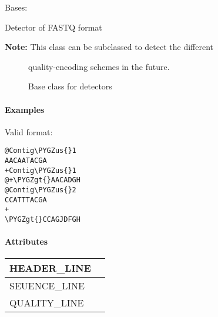 \documentclass[letterpaper,10pt,english]{sphinxmanual}
\def\PYGZus{\char`\_}
\def\PYGZgt{\char`\>}
\begin{document}
\begin{fulllineitems}
\label{fseq.reading:fseq.reading.seq_encoder.FastQ}
Bases: {\hyperref[fseq.reading:fseq.reading.seq_encoder.SeqFormat]{}}

Detector of FASTQ format
\begin{description}
\item[{\textbf{Note:} This class can be subclassed to detect the different}] \leavevmode
quality-encoding schemes in the future.

\end{description}



\begin{description}
\item[{{\hyperref[fseq.reading:fseq.reading.seq_encoder.SeqFormat]{}}}] \leavevmode
Base class for detectors

\end{description}


\paragraph{Examples}

Valid format:

\begin{Verbatim}[commandchars=\\\{\}]
@Contig\PYGZus{}1
AACAATACGA
+Contig\PYGZus{}1
@+\PYGZgt{}AACADGH
@Contig\PYGZus{}2
CCATTTACGA
+
\PYGZgt{}CCAGJDFGH
\end{Verbatim}
\paragraph{Attributes}

\begin{tabulary}{\linewidth}{|L|L|}
\hline

HEADER\_LINE
 & \\
\hline
SEUENCE\_LINE
 & \\
\hline
QUALITY\_LINE
 & \\
\hline\end{tabulary}


\begin{fulllineitems}
\label{fseq.reading:fseq.reading.seq_encoder.FastQ.HEADER_LINE}
\end{fulllineitems}


\end{fulllineitems}
\end{document}
